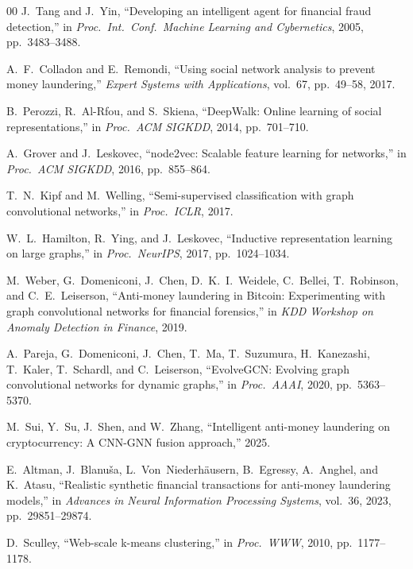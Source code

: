 \documentclass[conference]{IEEEtran}
\begin{document}
\begin{thebibliography}{00}
J.~Tang and J.~Yin, ``Developing an intelligent agent for financial fraud detection,'' in \textit{Proc.\ Int.\ Conf.\ Machine Learning and Cybernetics}, 2005, pp.\ 3483--3488.

A.~F.~Colladon and E.~Remondi, ``Using social network analysis to prevent money laundering,'' \textit{Expert Systems with Applications}, vol.~67, pp.\ 49--58, 2017.

B.~Perozzi, R.~Al-Rfou, and S.~Skiena, ``DeepWalk: Online learning of social representations,'' in \textit{Proc.\ ACM SIGKDD}, 2014, pp.\ 701--710.

A.~Grover and J.~Leskovec, ``node2vec: Scalable feature learning for networks,'' in \textit{Proc.\ ACM SIGKDD}, 2016, pp.\ 855--864.

T.~N.~Kipf and M.~Welling, ``Semi-supervised classification with graph convolutional networks,'' in \textit{Proc.\ ICLR}, 2017.

W.~L.~Hamilton, R.~Ying, and J.~Leskovec, ``Inductive representation learning on large graphs,'' in \textit{Proc.\ NeurIPS}, 2017, pp.\ 1024--1034.

M.~Weber, G.~Domeniconi, J.~Chen, D.~K.~I.~Weidele, C.~Bellei, T.~Robinson, and C.~E.~Leiserson, ``Anti-money laundering in Bitcoin: Experimenting with graph convolutional networks for financial forensics,'' in \textit{KDD Workshop on Anomaly Detection in Finance}, 2019.

A.~Pareja, G.~Domeniconi, J.~Chen, T.~Ma, T.~Suzumura, H.~Kanezashi, T.~Kaler, T.~Schardl, and C.~Leiserson, ``EvolveGCN: Evolving graph convolutional networks for dynamic graphs,'' in \textit{Proc.\ AAAI}, 2020, pp.\ 5363--5370.

M.~Sui, Y.~Su, J.~Shen, and W.~Zhang, ``Intelligent anti-money laundering on cryptocurrency: A CNN-GNN fusion approach,'' 2025.

E.~Altman, J.~Blanu\v{s}a, L.~Von~Niederhäusern, B.~Egressy, A.~Anghel, and K.~Atasu, ``Realistic synthetic financial transactions for anti-money laundering models,'' in \textit{Advances in Neural Information Processing Systems}, vol.~36, 2023, pp.\ 29851--29874.

D.~Sculley, ``Web-scale k-means clustering,'' in \textit{Proc.\ WWW}, 2010, pp.\ 1177--1178.


\end{thebibliography}
\end{document}
